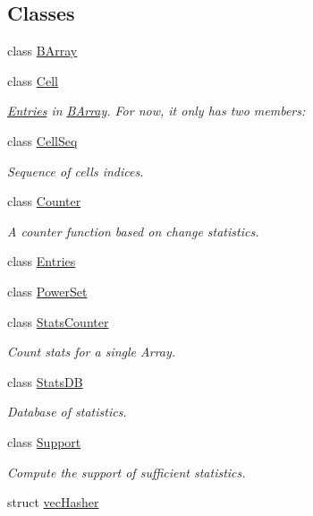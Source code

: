 \subsection*{Classes}
\begin{DoxyCompactItemize}
\item 
class \hyperlink{classbarry_1_1_b_array}{B\+Array}
\item 
class \hyperlink{classbarry_1_1_cell}{Cell}
\begin{DoxyCompactList}\small\item\em \hyperlink{classbarry_1_1_entries}{Entries} in \hyperlink{classbarry_1_1_b_array}{B\+Array}. For now, it only has two members\+: \end{DoxyCompactList}\item 
class \hyperlink{classbarry_1_1_cell_seq}{Cell\+Seq}
\begin{DoxyCompactList}\small\item\em Sequence of cells indices. \end{DoxyCompactList}\item 
class \hyperlink{classbarry_1_1_counter}{Counter}
\begin{DoxyCompactList}\small\item\em A counter function based on change statistics. \end{DoxyCompactList}\item 
class \hyperlink{classbarry_1_1_entries}{Entries}
\item 
class \hyperlink{classbarry_1_1_power_set}{Power\+Set}
\item 
class \hyperlink{classbarry_1_1_stats_counter}{Stats\+Counter}
\begin{DoxyCompactList}\small\item\em Count stats for a single Array. \end{DoxyCompactList}\item 
class \hyperlink{classbarry_1_1_stats_d_b}{Stats\+DB}
\begin{DoxyCompactList}\small\item\em Database of statistics. \end{DoxyCompactList}\item 
class \hyperlink{classbarry_1_1_support}{Support}
\begin{DoxyCompactList}\small\item\em Compute the support of sufficient statistics. \end{DoxyCompactList}\item 
struct \hyperlink{structbarry_1_1vec_hasher}{vec\+Hasher}
\end{DoxyCompactItemize}
